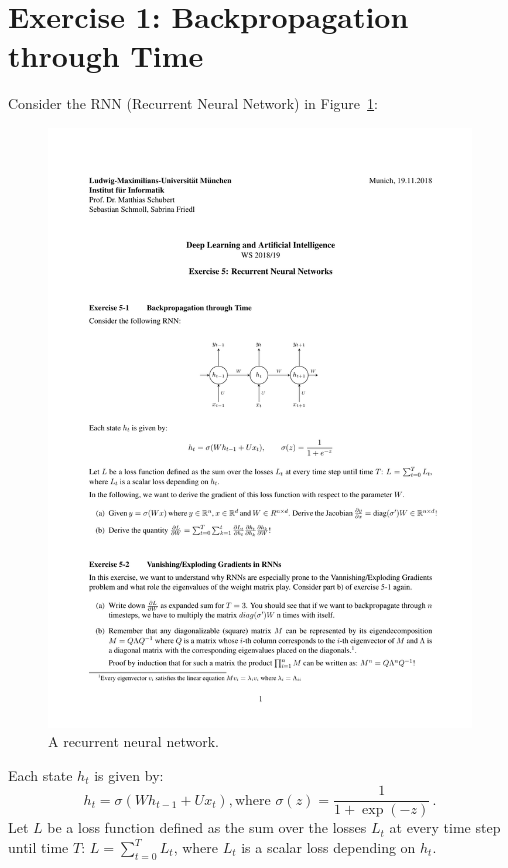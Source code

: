 \documentclass[12pt]{article}
\begin{document}
\section{\begingroup \large Exercise 1: Backpropagation through Time \endgroup}
\noindent Consider the RNN (Recurrent Neural Network) in Figure~\ref{fig:rnn}:
\begin{figure}[h]
\label{fig:rnn}
\centering
\includegraphics[scale=1.2]{rnn.pdf}
\vspace{-1em}
\caption{A recurrent neural network.}
\end{figure}

\noindent Each state $h_t$ is given by:
\begin{equation*}
h_t = \sigma(W h_{t-1} + U x_t), \text{where } \sigma(z) =\frac{1}{1+\exp(-z)} \,.
\end{equation*}
Let $L$ be a loss function defined as the sum over the losses $L_t$ at every time step until time $T$: $L=\sum_{t=0}^T L_t$, where $L_t$ is a scalar loss depending on $h_t$.
\end{document}
